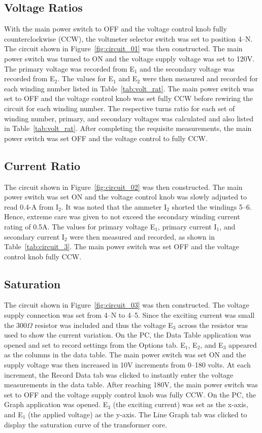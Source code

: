 \documentclass{article}
\begin{document}
\subsection{Voltage Ratios}

\label{part1} With the main power switch to OFF and the voltage control knob
fully counterclockwise (CCW), the voltmeter selector switch was set to position
4--N. The circuit shown in Figure~\ref{fig:circuit_01}  was then constructed.
The main power switch was turned to ON and the voltage supply voltage was set
to 120V. The primary voltage was recorded from E$_1$ and the secondary voltage
was recorded from E$_2$.  The values for E$_1$ and E$_2$ were then measured and
recorded for each winding number listed in Table~\ref{tab:volt_rat}. The main
power switch was set to OFF and the voltage control knob was set fully CCW
before rewiring the circuit for each winding number. The respective turns ratio
for each set of winding number, primary, and secondary voltages was calculated
and also listed in Table~\ref{tab:volt_rat}. After completing the requisite
measurements, the main power switch was set OFF and the voltage control to
fully CCW.

\subsection{Current Ratio}

\label{part2} The circuit shown in Figure~\ref{fig:circuit_02} was then
constructed. The main power switch was set ON and the voltage control knob was
slowly adjusted to read 0.4-A from I$_2$. It was noted that the ammeter I$_2$
shorted the windings 5--6.  Hence, extreme care was given to not exceed the
secondary winding current rating of 0.5A. The values for primary voltage E$_1$,
primary current I$_1$, and secondary current I$_2$ were then measured and
recorded, as shown in Table~\ref{tab:circuit_3}.  The main power switch was set
OFF and the voltage control knob fully CCW.

\subsection{Saturation}

\label{part3} The circuit shown in Figure~\ref{fig:circuit_03} was then
constructed. The voltage supply connection was set from 4--N to 4--5. Since the
exciting current was small the 300$\Omega$ resistor was included and thus the
voltage E$_3$ across the resistor was used to show the current variation. On
the PC, the Data Table application was opened and set to record settings from
the Options tab. E$_1$, E$_2$, and E$_3$ appeared as the columns in the data
table. The main power switch was set ON and the supply voltage was then
increased in 10V increments from 0--180 volts. At each increment, the Record
Data tab was clicked to instantly enter the voltage measurements in the data
table. After reaching 180V, the main power switch was set to OFF and the
voltage supply control knob was fully {CCW}. On the {PC}, the Graph application
was opened.  E$_3$ (the exciting current) was set as the x-axis, and E$_1$ (the
applied voltage) as the y-axis. The Line Graph tab was clicked to display the
saturation curve of the transformer core.
\end{document}
